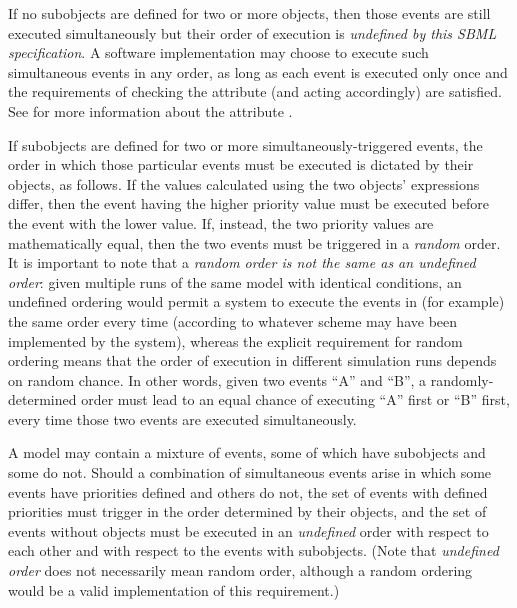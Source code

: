 If no \Priority subobjects are defined for two or more \Event
objects, then those events are still executed simultaneously but
their order of execution is \emph{undefined by this SBML
  specification}.  A software implementation may choose to execute
such simultaneous events in any order, as long as each event is
executed only once and the requirements of checking the
 attribute (and acting accordingly) are
satisfied.  See  for more
information about the attribute .

If \Priority subobjects are defined for two or more
simultaneously-triggered events, the order in which those particular
events must be executed is dictated by their \Priority objects,
as follows.  If the values calculated using the two \Priority
objects'  expressions differ, then the event having
the higher priority value must be executed before the event with
the lower value.  If, instead, the two priority values are
mathematically equal, then the two events must be triggered in a
\emph{random} order.  It is important to note that a \emph{random
  order is not the same as an undefined order}: given multiple
runs of the same model with identical conditions, an undefined
ordering would permit a system to execute the events in (for
example) the same order every time (according to whatever scheme
may have been implemented by the system), whereas the explicit
requirement for random ordering means that the order of execution
in different simulation runs depends on random chance.  In other
words, given two events ``A'' and ``B'', a randomly-determined
order must lead to an equal chance of executing ``A'' first or
``B'' first, every time those two events are executed
simultaneously.

A model may contain a mixture of events, some of which have
\Priority subobjects and some do not.  Should a combination of
simultaneous events arise in which some events have priorities
defined and others do not, the set of events with defined
priorities must trigger in the order determined by their \Priority
objects, and the set of events without \Priority objects must be
executed in an \emph{undefined} order with respect to each other
and with respect to the events with \Priority subobjects.  (Note
that \emph{undefined order} does not necessarily mean random
order, although a random ordering would be a valid implementation
of this requirement.)

